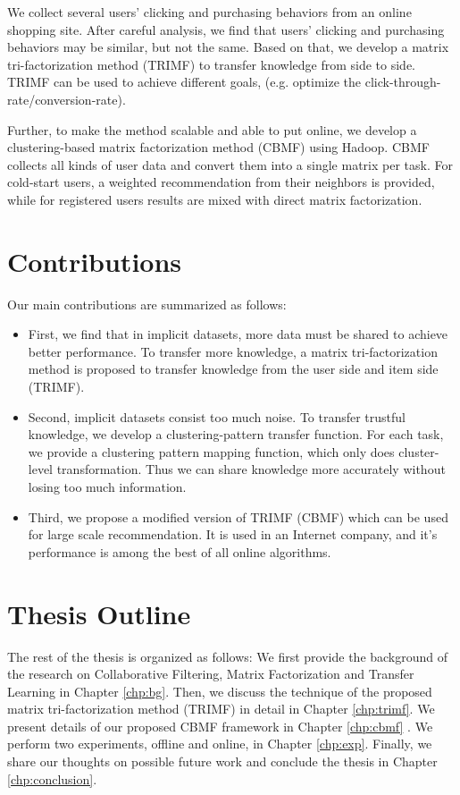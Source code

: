 We collect several users’ clicking and purchasing behaviors from an online shopping site. After careful analysis, we find that users’ clicking and purchasing behaviors may be similar, but not the same. Based on that, we develop a matrix tri-factorization method (TRIMF) to transfer knowledge from side to side. TRIMF can be used to achieve different goals, (e.g. optimize the click-through-rate/conversion-rate).

Further, to make the method scalable and able to put online, we develop a clustering-based matrix factorization method (CBMF) using Hadoop. CBMF collects all kinds of user data and convert them into a single matrix per task. For cold-start users, a weighted recommendation from their neighbors is provided, while for registered users results are mixed with direct matrix factorization.

\hspace{0.1in}
\section{Contributions}

Our main contributions are summarized as follows:

\begin{itemize}[noitemsep,topsep=0pt,parsep=0pt,partopsep=0pt]
\item First, we find that in implicit datasets, more data must be shared to achieve better performance. To transfer more knowledge, a matrix tri-factorization method is proposed to transfer knowledge from the user side and item side (TRIMF).
\item Second, implicit datasets consist too much noise. To transfer trustful knowledge, we develop a clustering-pattern transfer function. For each task, we provide a clustering pattern mapping function, which only does cluster-level transformation. Thus we can share knowledge more accurately without losing too much information.
\item Third, we propose a modified version of TRIMF (CBMF) which can be used for large scale recommendation. It is used in an Internet company, and it's performance is among the best of all online algorithms.
\end{itemize}

\hspace{0.1in}
\section{Thesis Outline}

The rest of the thesis is organized as follows: We first provide the background of the research on Collaborative Filtering, Matrix Factorization and Transfer Learning in Chapter \ref{chp:bg}. Then, we discuss the technique of the proposed matrix tri-factorization method (TRIMF) in detail in Chapter \ref{chp:trimf}. We present details of our proposed CBMF framework in Chapter \ref{chp:cbmf} . We perform two experiments, offline and online, in Chapter \ref{chp:exp}. Finally, we share our thoughts on possible future work and conclude the thesis in Chapter \ref{chp:conclusion}.



